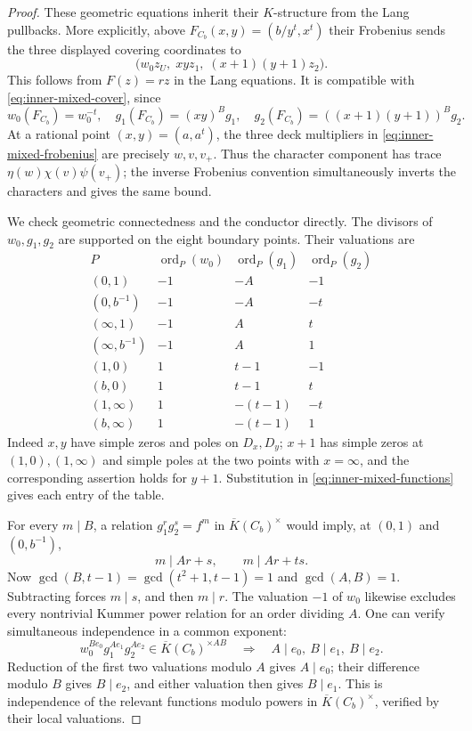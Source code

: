 \documentclass[11pt]{article}
\begin{document}
\begin{proof}
These geometric equations inherit their $K$-structure from the
Lang pullbacks. More explicitly, above
$F_{C_b}(x,y)=(b/y^t,x^t)$ their Frobenius sends the three
displayed covering coordinates to
\begin{equation}\label{eq:inner-mixed-frobenius}
 \bigl(w_0z_U,\;xy z_1,\;(x+1)(y+1)z_2\bigr).
\end{equation}
This follows from $F(z)=r z$ in the Lang equations.
It is compatible with \eqref{eq:inner-mixed-cover}, since
\[
 w_0(F_{C_b})=w_0^{-t},\quad
 g_1(F_{C_b})=(xy)^B g_1,\quad
 g_2(F_{C_b})=((x+1)(y+1))^B g_2.
\]
At a rational point $(x,y)=(a,a^t)$, the three deck multipliers
in \eqref{eq:inner-mixed-frobenius} are precisely $w,v,v_+$.
Thus the character component has trace $\eta(w)\chi(v)\psi(v_+)$;
the inverse Frobenius convention simultaneously inverts the
characters and gives the same bound.

We check geometric connectedness and the conductor directly.
The divisors of $w_0,g_1,g_2$ are supported on the eight boundary
points. Their valuations are
\begin{equation}\label{eq:inner-mixed-valuations}
\begin{array}{c|rrr}
 P&\operatorname{ord}_P(w_0)&\operatorname{ord}_P(g_1)&
       \operatorname{ord}_P(g_2)\\\hline
 (0,1)&-1&-A&-1\\
 (0,b^{-1})&-1&-A&-t\\
 (\infty,1)&-1&A&t\\
 (\infty,b^{-1})&-1&A&1\\
 (1,0)&1&t-1&-1\\
 (b,0)&1&t-1&t\\
 (1,\infty)&1&-(t-1)&-t\\
 (b,\infty)&1&-(t-1)&1
\end{array}
\end{equation}
Indeed $x,y$ have simple zeros and poles on $D_x,D_y$;
$x+1$ has simple zeros at $(1,0),(1,\infty)$ and simple poles
at the two points with $x=\infty$, and the corresponding assertion
holds for $y+1$. Substitution in \eqref{eq:inner-mixed-functions}
gives each entry of the table.

For every $m\mid B$, a relation $g_1^r g_2^s=f^m$ in
$\overline K(C_b)^\times$ would imply, at $(0,1)$ and
$(0,b^{-1})$,
\[
 m\mid Ar+s,\qquad m\mid Ar+ts.
\]
Now $\gcd(B,t-1)=\gcd(t^2+1,t-1)=1$ and $\gcd(A,B)=1$.
Subtracting forces $m\mid s$, and then $m\mid r$.
The valuation $-1$ of $w_0$ likewise excludes every nontrivial
Kummer power relation for an order dividing $A$.
One can verify simultaneous independence in a common exponent:
\[
 w_0^{Be_0}g_1^{Ae_1}g_2^{Ae_2}
       \in\overline K(C_b)^{\times AB}
 \quad\Longrightarrow\quad
 A\mid e_0,\ B\mid e_1,\ B\mid e_2.
\]
Reduction of the first two valuations modulo $A$ gives $A\mid e_0$;
their difference modulo $B$ gives $B\mid e_2$, and either valuation
then gives $B\mid e_1$.
This is independence of the relevant functions modulo powers in
$\overline K(C_b)^\times$, verified by their local valuations.


\end{proof}
\end{document}
